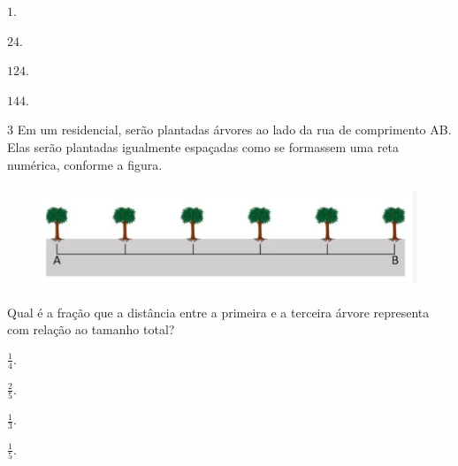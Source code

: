 \begin{escolha}
\item $1$.
\item $24$.
\item $124$.
\item $144$.
\end{escolha}



\num{3}  Em um residencial, serão plantadas árvores ao lado da rua de comprimento AB.
Elas serão plantadas igualmente espaçadas como se formassem uma reta
numérica, conforme a figura.

\begin{figure}[H]
\centering\includegraphics[width=5in,height=1.19792in]{./imgSAEB_6_MAT/media/image109.png}
\end{figure}

Qual é a fração que a distância entre a primeira e a terceira árvore
representa com relação ao tamanho total?

\begin{escolha}
\item $\frac{1}{4}$.
\item $\frac{2}{5}$.
\item $\frac{1}{3}$.
\item $\frac{1}{5}$.
\end{escolha}


